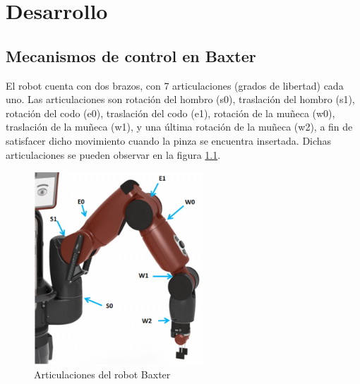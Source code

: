 
\chapter{Desarrollo}
\section{Mecanismos de control en Baxter}
El robot cuenta con dos brazos, con 7 articulaciones (grados de libertad) cada uno. Las articulaciones son rotación del hombro (s0), traslación del hombro (s1), rotación del codo (e0), traslación del codo (e1), rotación de la muñeca (w0), traslación de la muñeca (w1), y una última rotación de la muñeca (w2), a fin de satisfacer dicho movimiento cuando la pinza se encuentra insertada. Dichas articulaciones se pueden observar en la figura \ref{fig:desarrollo/joints}.

\begin{figure}[]
	\centering
	\includegraphics[width=2.5in]{imagenes/desarrollo/baxter_joint_names.png}
	\caption{Articulaciones del robot Baxter}
	\label{fig:desarrollo/joints}
\end{figure}

